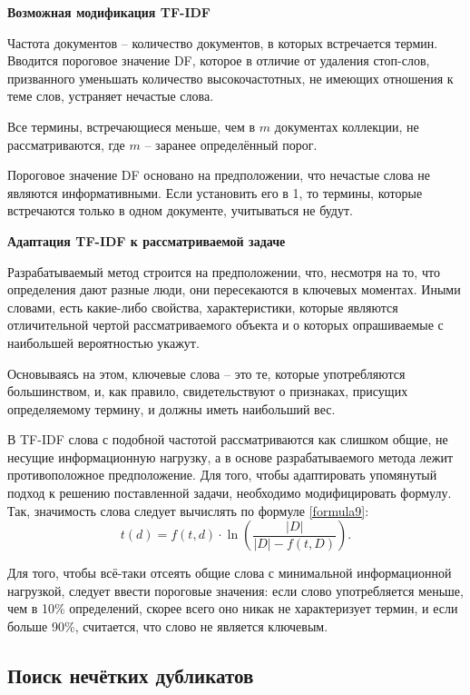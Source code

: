 \textbf{Возможная модификация TF-IDF} 

Частота документов -- количество документов, в которых встречается термин. Вводится пороговое значение DF, которое в отличие от удаления стоп-слов, призванного уменьшать количество высокочастотных, не имеющих отношения к теме слов, устраняет нечастые слова. 

Все термины, встречающиеся меньше, чем в $m$ документах коллекции, не рассматриваются, где $m$ -- заранее определённый порог.

Пороговое значение DF основано на предположении, что нечастые слова не являются информативными. Если установить его в 1, то термины, которые встречаются только в одном документе, учитываться не будут. \newline

\textbf{Адаптация TF-IDF к рассматриваемой задаче}

Разрабатываемый метод строится на предположении, что, несмотря на то, что определения дают разные люди, они пересекаются в ключевых моментах. Иными словами, есть какие-либо свойства, характеристики, которые являются отличительной чертой рассматриваемого объекта и о которых опрашиваемые с наибольшей вероятностью укажут.

Основываясь на этом, ключевые слова -- это те, которые употребляются большинством, и, как правило, свидетельствуют о признаках, присущих определяемому термину, и должны иметь наибольший вес.

В TF-IDF слова с подобной частотой рассматриваются как слишком общие, не несущие информационную нагрузку, а в основе разрабатываемого метода лежит противоположное предположение. Для того, чтобы адаптировать упомянутый подход к решению поставленной задачи, необходимо модифицировать формулу. Так, значимость слова следует вычислять по формуле \ref{formula9}:
\begin{equation}\label{formula9}
	t(d) = f(t, d) \cdot \ln \left( \frac{\left| D \right|}{\left| D \right| - f(t, D)} \right).
\end{equation}

Для того, чтобы всё-таки отсеять общие слова с минимальной информационной нагрузкой, следует ввести пороговые значения: если слово употребляется меньше, чем в 10\% определений, скорее всего оно никак не характеризует термин, и если больше 90\%, считается, что слово не является ключевым. \\

\subsection{Поиск нечётких дубликатов}
